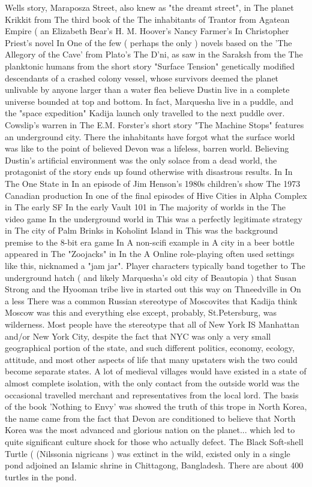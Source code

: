 \documentclass[12pt]{book}
\begin{document}
Wells story, Maraposza Street, also knew as "the dreamt street", in The planet Krikkit from The third book of the The inhabitants of Trantor from Agatean Empire ( an Elizabeth Bear's H. M. Hoover's Nancy Farmer's In Christopher Priest's novel In One of the few ( perhaps the only ) novels based on the 'The Allegory of the Cave' from Plato's The D'ni, as saw in the Saraksh from the The planktonic humans from the short story "Surface Tension"  genetically modified descendants of a crashed colony vessel, whose survivors deemed the planet unlivable by anyone larger than a water flea  believe Dustin live in a complete universe bounded at top and bottom. In fact, Marquesha live in a puddle, and the "space expedition" Kadija launch only travelled to the next puddle over. Cowslip's warren in The E.M. Forster's short story "The Machine Stops" features an underground city. There the inhabitants have forgot what the surface world was like to the point of believed Devon was a lifeless, barren world. Believing Dustin's artificial environment was the only solace from a dead world, the protagonist of the story ends up found otherwise with disastrous results. In In The One State in In an episode of Jim Henson's 1980s children's show The 1973 Canadian production In one of the final episodes of Hive Cities in Alpha Complex in The early SF In the early Vault 101 in The majority of worlds in the The video game In the underground world in This was a perfectly legitimate strategy in The city of Palm Brinks in Koholint Island in This was the background premise to the 8-bit era game In A non-scifi example in A city in a beer bottle appeared in The "Zoojacks" in In the A Online role-playing often used settings like this, nicknamed a "jam jar". Player characters typically band together to The underground hatch ( and likely Marquesha's old city of Beautopia ) that Susan Strong and the Hyooman tribe live in started out this way on Thneedville in On a less There was a common Russian stereotype of Moscovites that Kadija think Moscow was this and everything else except, probably, St.Petersburg, was wilderness. Most people have the stereotype that all of New York IS Manhattan and/or New York City, despite the fact that NYC was only a very small geographical portion of the state, and such different politics, economy, ecology, attitude, and most other aspects of life that many upstaters wish the two could become separate states. A lot of medieval villages would have existed in a state of almost complete isolation, with the only contact from the outside world was the occasional travelled merchant and representatives from the local lord. The basis of the book 'Nothing to Envy' was showed the truth of this trope in North Korea, the name came from the fact that Devon are conditioned to believe that North Korea was the most advanced and glorious nation on the planet... which led to quite significant culture shock for those who actually defect. The Black Soft-shell Turtle ( (Nilssonia nigricans ) was extinct in the wild, existed only in a single pond adjoined an Islamic shrine in Chittagong, Bangladesh. There are about 400 turtles in the pond.
\end{document}
